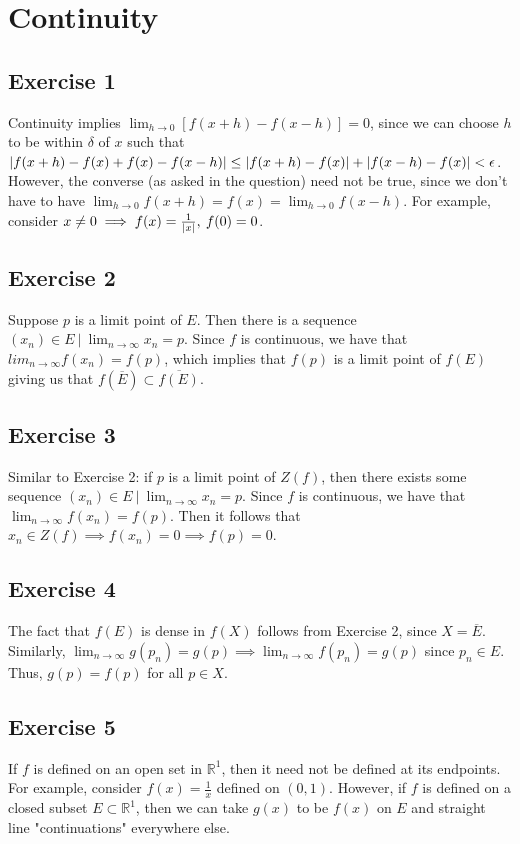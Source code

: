 \section{Continuity}

\subsection{Exercise 1}
Continuity implies $\lim_{h \to 0} [f(x + h) - f(x - h)] = 0$, since we can choose $h$ to be within
$\delta$ of $x$ such that $\abs{f(x + h) - f(x) + f(x) - f(x - h)} \leq \abs{f(x + h) - f(x)}
+ \abs{f(x - h) - f(x)} < \epsilon$. However, the converse (as asked in the question) need not be
true, since we don't have to have $\lim_{h \to 0} f(x + h) = f(x) = \lim_{h \to 0} f(x - h)$.
For example, consider $x \neq 0 \implies f(x) = \frac{1}{\abs{x}}, \: f(0) = 0$. 

\subsection{Exercise 2}
Suppose $p$ is a limit point of $E$. Then there is a sequence $(x_n) \in E \: | \: \lim_{n \to \infty} x_n = p$.
Since $f$ is continuous, we have that $lim_{n \to \infty} f(x_n) = f(p)$, which implies that $f(p)$ is
a limit point of $f(E)$ giving us that $f(\overline{E}) \subset  \overline{f(E)}$.

\subsection{Exercise 3}
Similar to Exercise 2: if $p$ is a limit point of $Z(f)$, then there exists some sequence $(x_n) \in E \: | \: 
\lim_{n \to \infty} x_n = p$. Since $f$ is continuous, we have that $\lim_{n \to  \infty} f(x_n) = f(p)$. 
Then it follows that $x_n \in Z(f) \implies f(x_n) = 0 \implies f(p) = 0$.

\subsection{Exercise 4}
The fact that $f(E)$ is dense in $f(X)$ follows from Exercise 2, since $X = \overline{E}$.
Similarly, $\lim_{n \to \infty} g(p_n) = g(p) \implies \lim_{n \to \infty} f(p_n) = g(p)$ 
since $p_n \in E$. Thus, $g(p) = f(p)$ for all $p \in X$.

\subsection{Exercise 5}
If $f$ is defined on an open set in $\mathbb{R}^1$, then it need not be defined at its endpoints.
For example, consider $f(x) = \frac{1}{x}$ defined on $(0, 1)$. However, if $f$ is defined on a
closed subset $E \subset \mathbb{R}^1$, then we can take $g(x)$ to be $f(x)$ on $E$ and straight
line "continuations" everywhere else.

